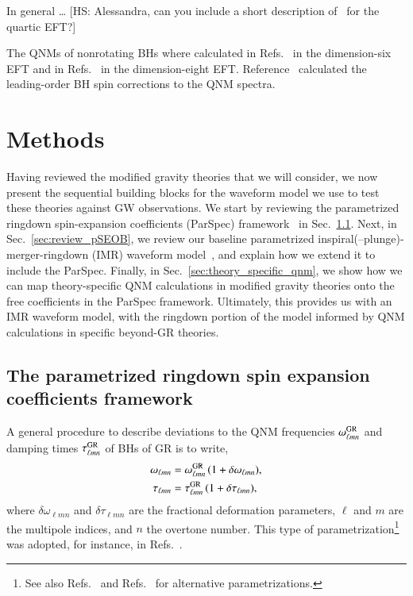 \documentclass[twocolumn,
               prd,
               aps,
               superscriptaddress,
               tightenlines,
               nofootinbib,
               eqsecnum,
               amsfonts,
               amsmath,
               longbibliography]{revtex4-1}
\newcommand{\hscomm}[1]{{\textcolor{TealBlue}{{[HS: #1]}}}}
\begin{document}
In general \dots
%
\hscomm{Alessandra, can you include a short description of~\cite{Sennett:2019bpc} for the quartic EFT?}

The QNMs of nonrotating BHs where calculated in Refs.~\cite{deRham:2020ejn,Cano:2020cao} in the dimension-six EFT
and in Refs.~\cite{Cardoso:2018ptl,Cano:2020cao} in the dimension-eight EFT.
%
Reference~\cite{Cano:2020cao} calculated the leading-order BH spin corrections to the QNM spectra.

\section{Methods}
\label{sec:method}

Having reviewed the modified gravity theories that we will consider, we now present
the sequential building blocks for the waveform model we use to test these theories
against GW observations.
%
We start by reviewing the parametrized ringdown spin-expansion coefficients
(ParSpec) framework~\cite{Maselli:2019mjd} in Sec.~\ref{sec:review_parspec}.
%
Next, in Sec.~\ref{sec:review_pSEOB}, we review our baseline
parametrized inspiral(--plunge)-merger-ringdown (IMR) waveform
model~\cite{Brito:2018rfr,Ghosh:2021mrv}, and explain how we extend
it to include the ParSpec.
%
Finally, in Sec.~\ref{sec:theory_specific_qnm}, we show how we can map
theory-specific QNM calculations in modified gravity theories onto the
free coefficients in the ParSpec framework.
%
Ultimately, this provides us with an IMR waveform model, with the ringdown
portion of the model informed by QNM calculations in specific beyond-GR
theories.

\subsection{The parametrized ringdown spin expansion coefficients framework}
\label{sec:review_parspec}

A general procedure to describe deviations to the QNM frequencies $\omega^{\rm GR}_{\ell m n}$ and
damping times $\tau^{\rm GR}_{\ell m n}$ of BHs of GR is to write,
%
\begin{subequations}
\label{eq:general_deviation}
\begin{align}
\omega_{\ell m n} &= \omega_{\ell m n}^{\rm GR} \, (1 + \delta \omega_{\ell m n}), \\
\tau_{\ell m n }   &= \tau_{\ell m  n}^{\rm GR}   \, (1 + \delta \tau_{\ell m n }),
\end{align}
\end{subequations}
%
where $\delta\omega_{\ell m n}$ and $\delta\tau_{\ell m  n}$ are the fractional deformation parameters,
$\ell$ and $m$ are the multipole indices, and $n$ the overtone number.
%
This type of parametrization\footnote{See also
Refs.~\cite{Glampedakis:2017dvb,Glampedakis:2019dqh,Silva:2019scu} and
Refs.~\cite{Cardoso:2019mqo,McManus:2019ulj,Kimura:2020mrh} for alternative parametrizations.}
was adopted, for instance, in Refs.~\cite{Gossan:2011ha,Meidam:2014jpa,Brito:2018rfr,Carullo:2018sfu,Ghosh:2021mrv}.
\end{document}
